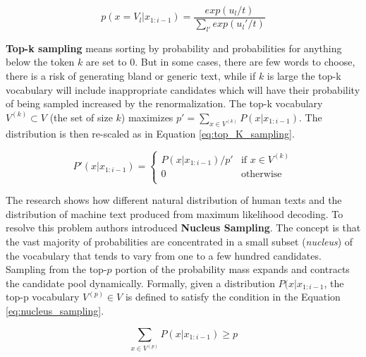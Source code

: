 \begin{equation} \label{eq:temperature_sampling}
p(x=V_l|x_{1:i-1}) = \frac{exp(u_l / t)}{\sum_{l'} exp(u_l' / t)}
\end{equation}

\textbf{Top-k sampling} means sorting by probability and probabilities for anything below the token $k$ are set to 0. But in some cases, there are few words to choose, there is a risk of generating bland or generic text, while if $k$ is large the top-k vocabulary will include inappropriate candidates which will have their probability of being sampled increased by the renormalization. The top-k vocabulary $V^{(k)} \subset V$ (the set of size $k$) maximizes $p' = \sum_{x \in V^{(k)}} P(x|x_{1:i-1})$. The distribution is then re-scaled as in Equation \ref{eq:top_K_sampling}.

\begin{equation} \label{eq:top_K_sampling}
P'(x|x_{1:i-1}) = \begin{cases} 
          P(x|x_{1:i-1}) / p' & \mbox{if $x \in V^{(k)}$} \\
          0 & \mbox{otherwise}\\
         \end{cases}
\end{equation}

The research shows how different natural distribution of human texts and the distribution of machine text produced from maximum likelihood decoding. To resolve this problem authors introduced \textbf{Nucleus Sampling}. The concept is that the vast majority of probabilities are concentrated in a small subset (\textit{nucleus}) of the vocabulary that tends to vary from one to a few hundred candidates. Sampling from the top-$p$ portion of the probability mass expands and contracts the candidate pool dynamically. Formally, given a distribution $P(x|x_{1:i-1}$, the top-p vocabulary $V^{(p)} \in V$ is defined to satisfy the condition in the Equation \ref{eq:nucleus_sampling}.

\begin{equation} \label{eq:nucleus_sampling}
\sum_{x \in V^{(p)}} P(x|x_{1:i-1})  \geqslant p
\end{equation}

